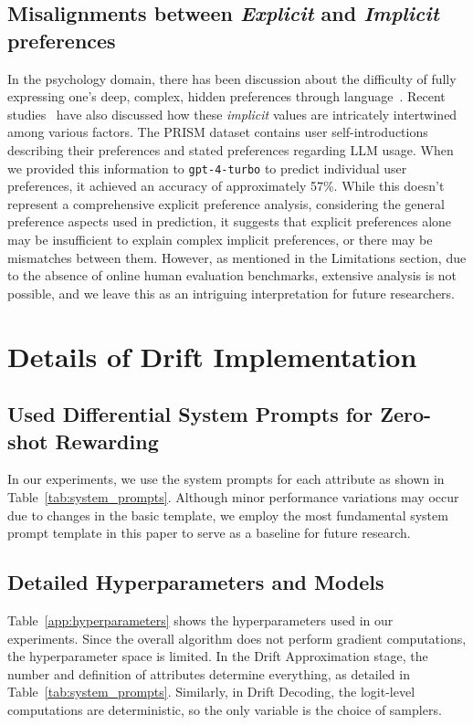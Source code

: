\subsection{Misalignments between \textit{Explicit} and \textit{Implicit} preferences}

In the psychology domain, there has been discussion about the difficulty of fully expressing one's deep, complex, hidden preferences through language~\citep{nisbett1977telling, pronin2001you}. Recent studies~\citep{jin2024implicit} have also discussed how these \textit{implicit} values are intricately intertwined among various factors. The PRISM dataset contains user self-introductions describing their preferences and stated preferences regarding LLM usage. When we provided this information to \texttt{gpt-4-turbo} to predict individual user preferences, it achieved an accuracy of approximately 57\%. While this doesn't represent a comprehensive explicit preference analysis, considering the general preference aspects used in prediction, it suggests that explicit preferences alone may be insufficient to explain complex implicit preferences, or there may be mismatches between them. However, as mentioned in the Limitations section, due to the absence of online human evaluation benchmarks, extensive analysis is not possible, and we leave this as an intriguing interpretation for future researchers.

\section{Details of Drift Implementation}

\subsection{Used Differential System Prompts for Zero-shot Rewarding}

In our experiments, we use the system prompts for each attribute as shown in Table~\ref{tab:system_prompts}. Although minor performance variations may occur due to changes in the basic template, we employ the most fundamental system prompt template in this paper to serve as a baseline for future research.

\subsection{Detailed Hyperparameters and Models}

Table~\ref{app:hyperparameters} shows the hyperparameters used in our experiments. Since the overall algorithm does not perform gradient computations, the hyperparameter space is limited. In the Drift Approximation stage, the number and definition of attributes determine everything, as detailed in Table~\ref{tab:system_prompts}. Similarly, in Drift Decoding, the logit-level computations are deterministic, so the only variable is the choice of samplers.


